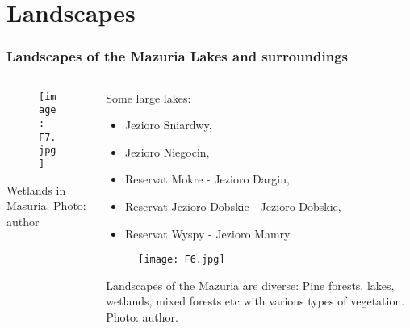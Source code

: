 \documentclass[pdflatex,compress,8pt,
	xcolor={dvipsnames,dvipsnames,svgnames,x11names,table},
	hyperref={colorlinks = true,
	breaklinks = true, urlcolor = NavyBlue, breaklinks = true}]{beamer}
\begin{document}
\section{Landscapes}
\begin{frame}\frametitle{Landscapes of the Mazuria Lakes and surroundings}
\begin{minipage}[0.4\textheight]{\textwidth}
\begin{columns}[T]
\begin{column}{0.4\textwidth}
\vspace{2em}
\begin{figure}[H]
	\centering
		\texttt{[image: F7.jpg]}
\end{figure}
\footnotesize{Wetlands in Masuria. Photo: author}
\end{column}
\begin{column}{0.6\textwidth}
\vspace{2em} 
Some large lakes:
\begin{itemize}
	\item Jezioro Sniardwy,
	\item Jezioro Niegocin,
	\item Reservat Mokre - Jezioro Dargin,
	\item Reservat Jezioro Dobskie - Jezioro Dobskie,
	\item Reservat Wyspy - Jezioro Mamry
\end{itemize}
\begin{figure}[H]
	\centering
		\texttt{[image: F6.jpg]}
\end{figure}
Landscapes of the Mazuria are diverse: Pine forests, lakes, wetlands, mixed forests etc with various types of vegetation. Photo: author.
\end{column}
\end{columns}
\end{minipage}
\end{frame}
\end{document}

